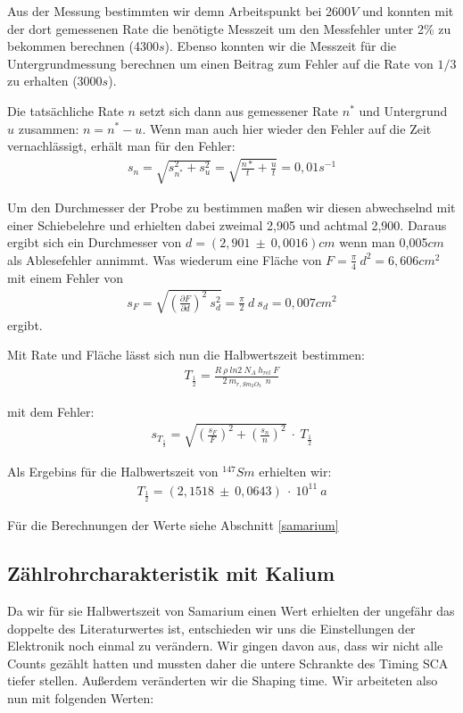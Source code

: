 \documentclass[12pt]{article}
\begin{document}
Aus der Messung bestimmten wir demn Arbeitspunkt bei 2600$V$ und konnten mit der dort gemessenen Rate die benötigte Messzeit um den Messfehler unter
2\% zu bekommen berechnen (4300$s$). Ebenso konnten wir die Messzeit für die Untergrundmessung berechnen um einen Beitrag zum Fehler auf die Rate
von $1/3$ zu erhalten (3000$s$).

Die tatsächliche Rate $n$ setzt sich dann aus gemessener Rate $n^*$ und Untergrund $u$ zusammen: $n = n^* - u$. Wenn man auch hier wieder den Fehler auf
die Zeit vernachlässigt, erhält man für den Fehler:
\begin{align}
 s_n = \sqrt{s_{n^*}^2 + s_u^2} = \sqrt{\frac{n*}{t} + \frac{u}{t}} = 0,01 s^{-1}
\end{align}

Um den Durchmesser der Probe zu bestimmen maßen wir diesen abwechselnd mit einer Schiebelehre und erhielten dabei zweimal 2,905 und achtmal 2,900.
Daraus ergibt sich ein Durchmesser von $d = (2,901~ \pm~ 0,0016)cm$ wenn man 0,005$cm$ als Ablesefehler annimmt. Was wiederum eine Fläche von
$F = \frac{\pi}{4}~d^2 = 6,606 cm^2$ mit einem Fehler von
\begin{align}
 s_F = \sqrt{\left(\frac{\partial F}{\partial d}\right)^2~s_d^2} = \frac{\pi}{2}~d~s_d = 0,007 cm^2
\end{align}
ergibt.

Mit Rate und Fläche lässt sich nun die Halbwertszeit bestimmen:
\begin{align}
T_{\frac{1}{2}} = \frac{R~\rho~ln 2 ~ N_A ~ h_{rel} ~ F}{2~m_{r,Sm_2O_3}~~n}
\end{align}

mit dem Fehler:
\begin{align}
 s_{T_{\frac{1}{2}}} = \sqrt{\left(\frac{s_F}{F}\right)^2 + \left(\frac{s_n}{n}\right)^2}~\cdot~T_{\frac{1}{2}}
\end{align}

Als Ergebins für die Halbwertszeit von $^{147}Sm$ erhielten wir:
\begin{align*}
T_{\frac{1}{2}} = (2,1518~\pm~0,0643)~\cdot~10^11~a
\end{align*}

Für die Berechnungen der Werte siehe Abschnitt \ref{samarium}

\subsection{Zählrohrcharakteristik mit Kalium}
Da wir für sie Halbwertszeit von Samarium einen Wert erhielten der ungefähr das doppelte des Literaturwertes ist, entschieden wir uns die Einstellungen der Elektronik noch einmal zu verändern. Wir gingen davon aus, dass wir nicht alle Counts gezählt hatten und mussten daher die untere Schrankte des Timing SCA tiefer stellen. Außerdem veränderten wir die Shaping time. Wir arbeiteten also nun mit folgenden Werten:
\end{document}
